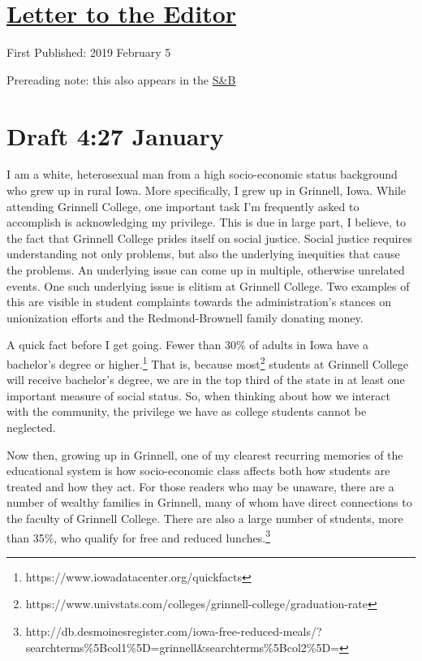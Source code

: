 \documentclass[12pt]{article}[titlepage]
\newcommand{\1}{\={a}}
\newcommand{\2}{\={e}}
\newcommand{\3}{\={\i}}
\newcommand{\4}{\=o}
\newcommand{\5}{\=u}
\newcommand{\6}{\={A}}
\renewcommand{\,}{\textsuperscript{,}}
\begin{document}
\doublespacing
\section{\href{letter-to-the-editor.html}{Letter to the Editor}}
First Published: 2019 February 5

Prereading note: this also appears in the \href{http://www.thesandb.com/opinion/letter-to-the-editor-opposing-brownells-and-supporting-the-union-is-hypocritical.html}{S&B}
\section{Draft 4:27 January}
I am a white, heterosexual man from a high socio-economic status background who grew up in rural Iowa.
More specifically, I grew up in Grinnell, Iowa.
While attending Grinnell College, one important task I'm frequently asked to accomplish is acknowledging my privilege.
This is due in large part, I believe, to the fact that Grinnell College prides itself on social justice.
Social justice requires understanding not only problems, but also the underlying inequities that cause the problems.
An underlying issue can come up in multiple, otherwise unrelated events.
One such underlying issue is elitism at Grinnell College.
Two examples of this are visible in student complaints towards the administration's stances on unionization efforts and the Redmond-Brownell family donating money.

A quick fact before I get going.
Fewer than 30\% of adults in Iowa have a bachelor's degree or higher.\footnote{https://www.iowadatacenter.org/quickfacts}
That is, because most\footnote{https://www.univstats.com/colleges/grinnell-college/graduation-rate} students at Grinnell College will receive bachelor's degree, we are in the top third of the state in at least one important measure of social status.
So, when thinking about how we interact with the community, the privilege we have as college students cannot be neglected.

Now then, growing up in Grinnell, one of my clearest recurring memories of the educational system is how socio-economic class affects both how students are treated and how they act.
For those readers who may be unaware, there are a number of wealthy families in Grinnell, many of whom have direct connections to the faculty of Grinnell College.
There are also a large number of students, more than 35\%, who qualify for free and reduced lunches.\footnote{http://db.desmoinesregister.com/iowa-free-reduced-meals/?searchterms\%5Bcol1\%5D=grinnell&searchterms\%5Bcol2\%5D=}
\end{document}

